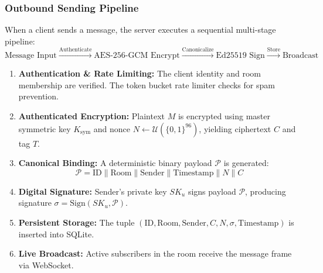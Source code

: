 \documentclass[11pt,a4paper]{article}
\begin{document}
\subsubsection{Outbound Sending Pipeline}
When a client sends a message, the server executes a sequential multi-stage pipeline:
\begin{equation}
\text{Message Input} \xrightarrow{\text{Authenticate}} \text{AES-256-GCM Encrypt} \xrightarrow{\text{Canonicalize}} \text{Ed25519 Sign} \xrightarrow{\text{Store}} \text{Broadcast}
\end{equation}
\begin{enumerate}
    \item \textbf{Authentication \& Rate Limiting:} The client identity and room membership are verified. The token bucket rate limiter checks for spam prevention.
    \item \textbf{Authenticated Encryption:} Plaintext $M$ is encrypted using master symmetric key $K_{\text{sym}}$ and nonce $N \leftarrow \mathcal{U}(\{0,1\}^{96})$, yielding ciphertext $C$ and tag $T$.
    \item \textbf{Canonical Binding:} A deterministic binary payload $\mathcal{P}$ is generated:
    \begin{equation}
    \mathcal{P} = \text{ID} \parallel \text{Room} \parallel \text{Sender} \parallel \text{Timestamp} \parallel N \parallel C
    \end{equation}
    \item \textbf{Digital Signature:} Sender's private key $SK_u$ signs payload $\mathcal{P}$, producing signature $\sigma = \text{Sign}(SK_u, \mathcal{P})$.
    \item \textbf{Persistent Storage:} The tuple $(\text{ID}, \text{Room}, \text{Sender}, C, N, \sigma, \text{Timestamp})$ is inserted into SQLite.
    \item \textbf{Live Broadcast:} Active subscribers in the room receive the message frame via WebSocket.
\end{enumerate}
\end{document}
